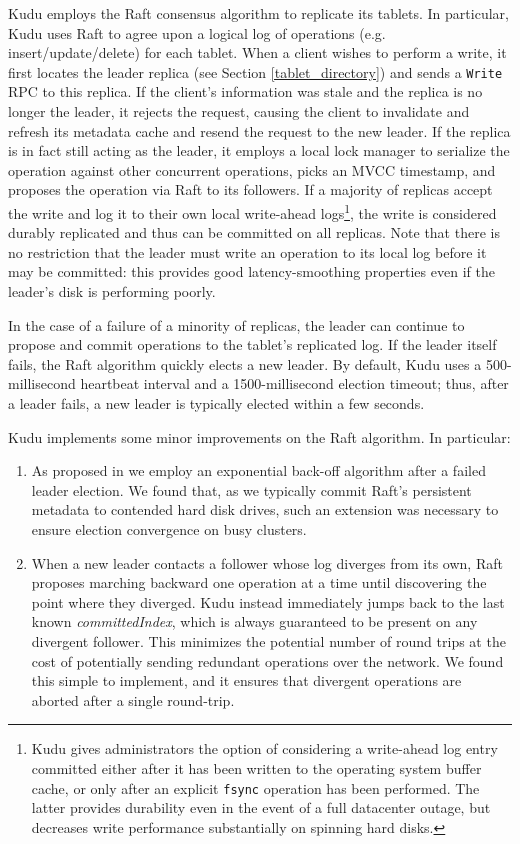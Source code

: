 \documentclass{vldb}
\begin{document}
Kudu employs the Raft\cite{raft} consensus algorithm to replicate its tablets.
In particular, Kudu uses Raft to agree upon a logical log of operations (e.g. insert/update/delete)
for each tablet. When a client wishes to perform a write, it first locates the leader replica (see
Section \ref{tablet_directory}) and sends a {\tt Write} RPC to this replica. If the client's information
was stale and the replica is no longer the leader, it rejects the request, causing the client
to invalidate and refresh its metadata cache and resend the request to the new leader. If
the replica is in fact still acting as the leader, it employs a local lock manager to serialize
the operation against other concurrent operations, picks an MVCC timestamp, and proposes
the operation via Raft to its followers. If a majority of replicas accept the write and log
it to their own local write-ahead logs\footnote{Kudu gives administrators the option of considering
a write-ahead log entry committed either after it has been written to the operating system buffer
cache, or only after an explicit {\tt fsync} operation has been performed. The latter provides
durability even in the event of a full datacenter outage, but decreases write performance
substantially on spinning hard disks.}, the write is considered
durably replicated and thus can be committed on all replicas. Note that there is no restriction
that the leader must write an operation to its local log before it may be committed:
this provides good latency-smoothing properties even if the leader's disk is performing poorly.

In the case of a failure of a minority of replicas, the leader can continue to propose
and commit operations to the tablet's replicated log. If the leader itself fails,
the Raft algorithm quickly elects a new leader. By default, Kudu uses a 500-millisecond heartbeat
interval and a 1500-millisecond election timeout; thus, after a leader fails, a new leader is
typically elected within a few seconds.

Kudu implements some minor improvements on the Raft algorithm. In particular:
\begin{enumerate}
\item As proposed in \cite{raft_refloated} we employ an exponential back-off algorithm
  after a failed leader election. We found that, as we typically commit Raft's
  persistent metadata to contended hard disk drives, such an extension was
  necessary to ensure election convergence on busy clusters.
\item When a new leader contacts a follower whose log diverges from its own,
  Raft proposes marching backward one operation at a time until discovering
  the point where they diverged. Kudu instead immediately jumps back to
  the last known {\em committedIndex}, which is always guaranteed to be
  present on any divergent follower. This minimizes the potential number
  of round trips at the cost of potentially sending redundant operations
  over the network. We found this simple to implement, and it ensures that
  divergent operations are aborted after a single round-trip.
\end{enumerate}
\end{document}
